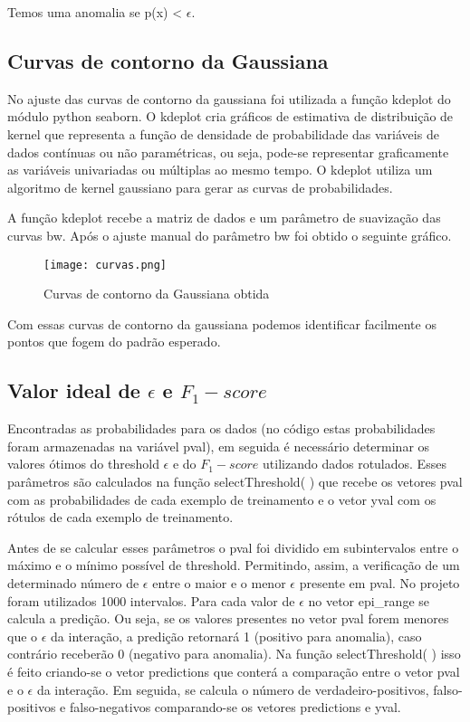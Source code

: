 \documentclass[12pt]{article}
\begin{document}
Temos uma anomalia se p(x) < $\epsilon$.


\subsection{Curvas de contorno da Gaussiana} \label{cur_gau}
No ajuste das curvas de contorno da gaussiana foi utilizada a função kdeplot do módulo python seaborn. O kdeplot cria gráficos de estimativa de distribuição de kernel que representa a função de densidade de probabilidade das variáveis de dados contínuas ou não paramétricas, ou seja, pode-se representar graficamente as variáveis univariadas ou múltiplas ao mesmo tempo. O kdeplot utiliza um algoritmo de kernel gaussiano para gerar as curvas de probabilidades.

A função kdeplot recebe a matriz de dados e um parâmetro de suavização das curvas bw. Após o ajuste manual do parâmetro bw foi obtido o seguinte gráfico.

\begin{figure} [htp]
\begin{center}
\texttt{[image: curvas.png]}
\caption{Curvas de contorno da
Gaussiana obtida} \label{curvas}
\end{center}
\end{figure}

Com essas curvas de contorno da gaussiana podemos identificar facilmente os pontos que fogem do padrão esperado.

\subsection{Valor ideal de $\epsilon$ e $F_{1}-score$} \label{}

Encontradas as probabilidades para os dados (no código estas probabilidades foram armazenadas na variável pval), em seguida é necessário determinar os valores ótimos do threshold $\epsilon$ e do $F_{1}-score$ utilizando dados rotulados. Esses parâmetros são calculados na função selectThreshold( ) que recebe os vetores pval com as probabilidades de cada exemplo de treinamento e o vetor yval com os rótulos de cada exemplo de treinamento. 

Antes de se calcular esses parâmetros o pval foi dividido em subintervalos entre o máximo e o mínimo possível de threshold. Permitindo, assim, a verificação de um determinado número de $\epsilon$ entre o maior e o menor $\epsilon$ presente em pval. No projeto foram utilizados 1000 intervalos. Para cada valor de $\epsilon$ no vetor epi\_range se calcula a predição. Ou seja, se os valores presentes no vetor pval forem menores que o $\epsilon$ da interação, a predição retornará 1 (positivo para anomalia), caso contrário receberão 0 (negativo para anomalia). Na função selectThreshold( ) isso é feito criando-se o vetor predictions que conterá a comparação entre o vetor pval e o $\epsilon$ da interação. Em seguida, se calcula o número de verdadeiro-positivos, falso-positivos e falso-negativos comparando-se os vetores predictions e yval. 
\end{document}
